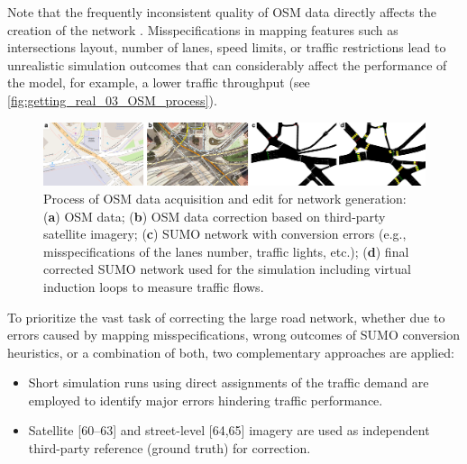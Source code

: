 Note that the frequently inconsistent quality of OSM data \citep{Haklay2010} directly affects the creation of the network \citep{Dingil2018}. Misspecifications in mapping features such as intersections layout, number of lanes, speed limits, or traffic restrictions lead to unrealistic simulation outcomes that can considerably affect the performance of the model, for example, a lower traffic throughput (see \autoref{fig:getting_real_03_OSM_process}).

\begin{figure}[htbp!]
    \centering
    \includegraphics[width=1\textwidth]{fig_03.png}
    \caption{Process of OSM data acquisition and edit for network generation: (\textbf{a}) OSM data; (\textbf{b}) OSM data correction based on third-party satellite imagery; (\textbf{c}) SUMO network with conversion errors (e.g., misspecifications of the lanes number, traffic lights, etc.); (\textbf{d}) final corrected SUMO network used for the simulation including virtual induction loops to measure traffic flows.}
   \label{fig:getting_real_03_OSM_process}
\end{figure}

To prioritize the vast task of correcting the large road network, whether due to errors caused by mapping misspecifications, wrong outcomes of SUMO conversion heuristics, or a combination of both, two complementary approaches are applied:
\begin{itemize}
    \item Short simulation runs using direct assignments of the traffic demand are employed to identify major errors hindering traffic performance.
    \item Satellite [60–63]\citep{Maxar2021,InstitutoGeograficoNacionaldeEspanaIGN2018,Sources:Esri2021,Sources:NASA2021} and street-level [64,65]\citep{GrabHoldings2021,Mapillaryandcontributors2021} imagery are used as independent third-party reference (ground truth) for correction.
\end{itemize}

